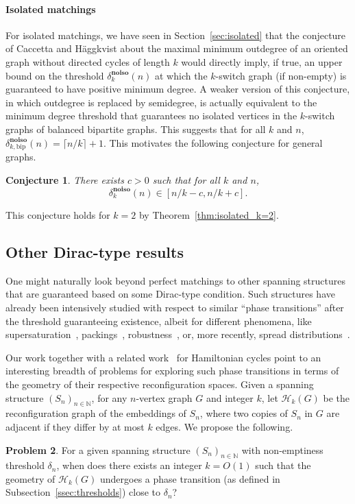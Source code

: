 \documentclass[11pt,a4paper]{article}
\newtheorem{conjecture}{Conjecture}[section]
\theoremstyle{definition}
\newtheorem{problem}[conjecture]{Problem}
\begin{document}
\paragraph{Isolated matchings}

For isolated matchings, we have seen in Section~\ref{sec:isolated} that the conjecture of Caccetta and Häggkvist about the maximal minimum outdegree of an oriented graph without directed cycles of length $k$ would directly imply, if true, an upper bound on the threshold $\delta^{\mathbf{no iso}}_k(n)$ at which the $k$-switch graph (if non-empty) is guaranteed to have positive minimum degree. A weaker version of this conjecture, in which outdegree is replaced by semidegree, is actually equivalent to the minimum degree threshold that guarantees no isolated vertices in the $k$-switch graphs of balanced bipartite graphs. This suggests that for all $k$ and $n$,
$\delta^{\mathbf{no iso}}_{k,\mathrm{bip}}(n) = \lceil n/k \rceil +1$. This motivates the following
conjecture for general graphs.

\begin{conjecture}\label{conj:isolated}
  There exists $c > 0$ such that for all $k$ and
  $n$, $$\delta^{\mathbf{no iso}}_k(n) \in [n/k-c, n/k +c].$$
\end{conjecture}

This conjecture holds for $k =2$ by Theorem~\ref{thm:isolated_k=2}.

\subsection{Other Dirac-type results}

One might naturally look beyond perfect matchings to other spanning structures that are guaranteed based on some Dirac-type condition.
Such structures have already been intensively studied with respect to similar ``phase transitions'' after the threshold guaranteeing existence, albeit for different phenomena, like supersaturation~\cite{komlos1995Proof}, packings~\cite{CKLOT16}, robustness~\cite{krivelevich2014Robust,allen2024Robust}, or, more recently, spread distributions~\cite{pham2022Toolkit,kelly2024Optimal,bastide2024Random}.

Our work together with a related work~\cite{kleer2020Hamiltonian} for Hamiltonian cycles point to an interesting breadth of problems for exploring such phase transitions in terms of the geometry of their respective reconfiguration spaces.
Given a spanning structure $(S_n)_{n\in \mathbb N}$,
for any $n$-vertex graph $G$ and integer $k$, let $\mathcal H_k(G)$ be the
reconfiguration graph of the embeddings of $S_n$, where two copies of $S_n$ in
$G$ are adjacent if they differ by at most $k$ edges. 
We propose the following. 
\begin{problem}
  For a given spanning structure $(S_n)_{n\in \mathbb N}$ with non-emptiness threshold
  $\delta_n$, when does there exists an integer $k = O(1)$ such that the geometry of $\mathcal H_k(G)$ undergoes a phase transition (as defined in Subsection~\ref{ssec:thresholds}) close to $\delta_n$?
\end{problem}
\end{document}
